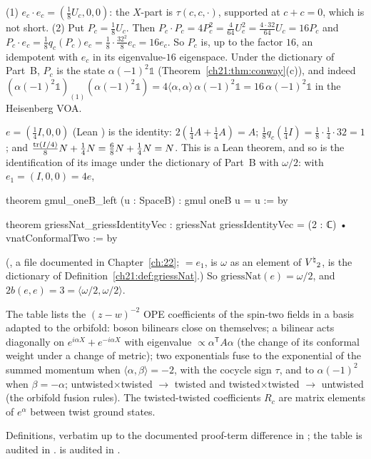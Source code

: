\begin{example}\label{ch21:ex:products}
(1) $e_c\cdot e_c=(\tfrac18U_c,0,0)$: the $X$-part is $\tau(c,c,\cdot)$, supported at $c+c=0$, which is
not short.  (2) Put $P_c=\tfrac18U_c$.  Then $P_c\cdot P_c=4P_c^2=\tfrac4{64}U_c^2=\tfrac{4\cdot32}{64}U_c=16P_c$
and $P_c\cdot e_c=\tfrac18q_c(P_c)e_c=\tfrac18\cdot\tfrac{32^2}8e_c=16e_c$.  So $P_c$ is, up to the factor
$16$, an idempotent with $e_c$ in its eigenvalue-$16$ eigenspace.  Under the dictionary of Part~B, $P_c$
is the state $\alpha(-1)^2\mathbb1$ (Theorem~\ref{ch21:thm:conway}(c)), and indeed
$(\alpha(-1)^2\mathbb1)_{(1)}(\alpha(-1)^2\mathbb1)=4\langle\alpha,\alpha\rangle\,\alpha(-1)^2\mathbb1=16\,\alpha(-1)^2\mathbb1$
in the Heisenberg VOA.
\end{example}

\begin{remark}\label{ch21:rem:unit}
$e=(\tfrac14I,0,0)$ (Lean ) is the identity: $2(\tfrac14A+\tfrac14A)=A$;
$\tfrac18q_c(\tfrac14I)=\tfrac18\cdot\tfrac14\cdot32=1$; and $\tfrac{\operatorname{tr}(I/4)}8N+\tfrac14N=\tfrac68N+\tfrac14N=N$.
This is a Lean theorem, and so is the identification of its image under the dictionary of Part~B with
$\omega/2$: with $e_1=(I,0,0)=4e$,
\begin{leancode}
theorem gmul_oneB_left (u : SpaceB) : gmul oneB u = u := by
\end{leancode}
\begin{leancode}
theorem griessNat_griessIdentityVec :
    griessNat griessIdentityVec = (2 : ℂ) • vnatConformalTwo := by
\end{leancode}
(, a file documented in
Chapter~\ref{ch:22};  $=e_1$,  is $\omega$ as an element of
${V^{\natural}}_2$,  is the dictionary of Definition~\ref{ch21:def:griessNat}.)  So
$\mathrm{griessNat}(e)=\omega/2$, and $2b(e,e)=3=\langle\omega/2,\omega/2\rangle$.
\end{remark}

\begin{physics}
The table lists the $(z-w)^{-2}$ OPE coefficients of the spin-two fields in a basis adapted to the
orbifold: boson bilinears close on themselves; a bilinear acts diagonally on $e^{i\alpha X}+e^{-i\alpha X}$
with eigenvalue $\propto\alpha^{\mathsf T}A\alpha$ (the change of its conformal weight under a change of
metric); two exponentials fuse to the exponential of the summed momentum when
$\langle\alpha,\beta\rangle=-2$, with the cocycle sign $\tau$, and to $\alpha(-1)^2$ when $\beta=-\alpha$;
untwisted$\times$twisted $\to$ twisted and twisted$\times$twisted $\to$ untwisted (the orbifold fusion
rules).  The twisted-twisted coefficients $R_c$ are matrix elements of $e^{\alpha}$ between twist ground
states.
\end{physics}
\begin{status}
Definitions, verbatim up to the documented proof-term difference in ; the table is audited
in .   is audited in
.
\end{status}

